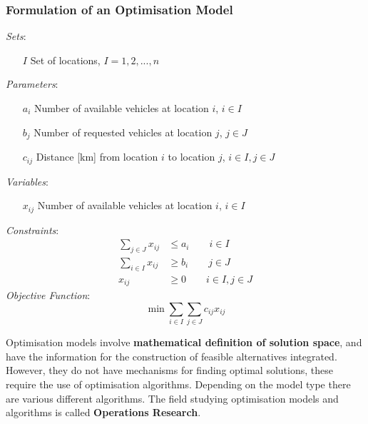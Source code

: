 \documentclass[11pt]{article}
\begin{document}
\subsubsection{Formulation of an Optimisation Model}
\emph{Sets}:
\begin{itemize}
	\item[$I$] Set of locations, $I={1,2,...,n}$
\end{itemize}
\noindent
\emph{Parameters}:
\begin{itemize}
	\item[$a_i$] Number of available vehicles at location $i$, $i\in I$
	\item[$b_j$] Number of requested vehicles at location $j$, $j\in J$
	\item[$c_{ij}$] Distance [km] from location $i$ to location $j$, $i\in I, j\in J$
\end{itemize}
\noindent
\emph{Variables}:
\begin{itemize}
	\item[$x_{ij}$] Number of available vehicles at location $i$, $i\in I$
\end{itemize}
\noindent
\emph{Constraints}:
\begin{align*}
	\sum_{j\in J} x_{ij} &\leq a_i \qquad i\in I\\
	\sum_{i\in I} x_{ij} &\geq b_i \qquad j\in J\\
	x_{ij}&\geq 0 \qquad i\in I,  j\in J
\end{align*}
\noindent
\emph{Objective Function}:
\begin{equation*}
	\min\sum_{i\in I}\sum_{j\in J}c_{ij}x_{ij}
\end{equation*}

\noindent
Optimisation models involve \textbf{mathematical definition of solution space}, and have the information for the construction of feasible alternatives integrated. However, they do not have mechanisms for finding optimal solutions, these require the use of optimisation algorithms. Depending on the model type there are various different algorithms. The field studying optimisation models and algorithms is called \textbf{Operations Research}.
\end{document}
